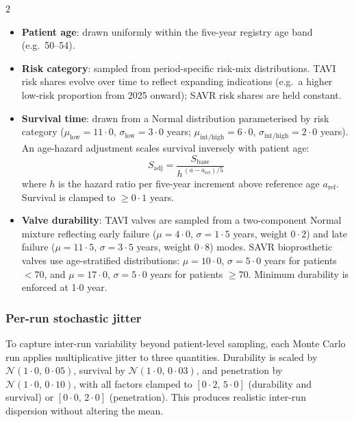 \documentclass[10pt, a4paper]{article}
\begin{document}
\begin{multicols}{2}
\begin{itemize}[leftmargin=*, itemsep=2pt]
    \item \textbf{Patient age}: drawn uniformly within the five-year registry age band (e.g.\ 50--54).
    \item \textbf{Risk category}: sampled from period-specific risk-mix distributions. TAVI risk shares evolve over time to reflect expanding indications (e.g.\ a higher low-risk proportion from 2025 onward); SAVR risk shares are held constant.
    \item \textbf{Survival time}: drawn from a Normal distribution parameterised by risk category ($\mu_{\text{low}} = 11{\cdot}0$, $\sigma_{\text{low}} = 3{\cdot}0$ years; $\mu_{\text{int/high}} = 6{\cdot}0$, $\sigma_{\text{int/high}} = 2{\cdot}0$ years). An age-hazard adjustment scales survival inversely with patient age:
    \begin{equation}
    S_{\text{adj}} = \frac{S_{\text{base}}}{h^{\,(a - a_{\text{ref}})/5}}
    \end{equation}
    where $h$ is the hazard ratio per five-year increment above reference age $a_{\text{ref}}$. Survival is clamped to $\geq 0{\cdot}1$ years.
    \item \textbf{Valve durability}: TAVI valves are sampled from a two-component Normal mixture reflecting early failure ($\mu = 4{\cdot}0$, $\sigma = 1{\cdot}5$ years, weight $0{\cdot}2$) and late failure ($\mu = 11{\cdot}5$, $\sigma = 3{\cdot}5$ years, weight $0{\cdot}8$) modes. SAVR bioprosthetic valves use age-stratified distributions: $\mu = 10{\cdot}0$, $\sigma = 5{\cdot}0$ years for patients $<$70, and $\mu = 17{\cdot}0$, $\sigma = 5{\cdot}0$ years for patients $\geq$70. Minimum durability is enforced at 1$\cdot$0 year.
\end{itemize}

\subsubsection{Per-run stochastic jitter}

To capture inter-run variability beyond patient-level sampling, each Monte Carlo run applies multiplicative jitter to three quantities. Durability is scaled by $\mathcal{N}(1{\cdot}0,\, 0{\cdot}05)$, survival by $\mathcal{N}(1{\cdot}0,\, 0{\cdot}03)$, and penetration by $\mathcal{N}(1{\cdot}0,\, 0{\cdot}10)$, with all factors clamped to $[0{\cdot}2,\, 5{\cdot}0]$ (durability and survival) or $[0{\cdot}0,\, 2{\cdot}0]$ (penetration). This produces realistic inter-run dispersion without altering the mean.


\end{multicols}
\end{document}
